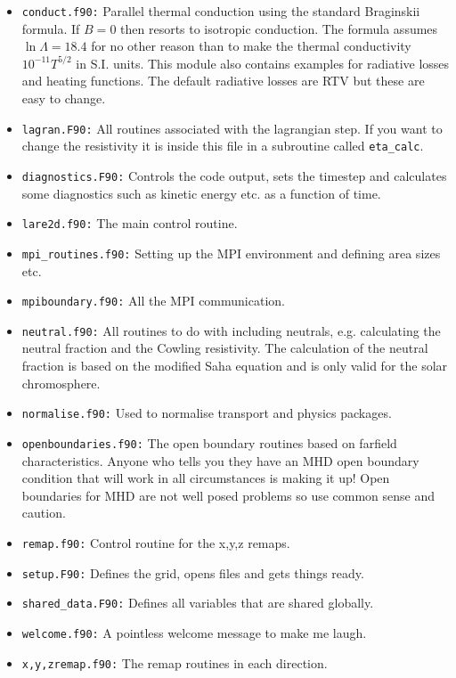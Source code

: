\documentclass[11pt]{article}
\begin{document}
\begin{itemize}
  \item{\texttt{conduct.f90:}} Parallel thermal conduction using the standard Braginskii formula. If $B=0$ then 
  resorts to isotropic conduction. The formula assumes $\ln\Lambda=18.4$ for no other reason than to make the 
  thermal conductivity $10^{-11}T^{5/2}$ in S.I. units. This module also contains examples for radiative losses 
  and heating functions. The default radiative losses are RTV but these are easy to change.
  \item{\texttt{lagran.F90:}} All routines associated with the lagrangian step. If you want to change the 
  resistivity it is inside this file in a subroutine called \texttt{eta\_calc}.
  \item{\texttt{diagnostics.F90:}} Controls the code output, sets the timestep and calculates some diagnostics such as 
  kinetic energy etc. as a function of time.
  \item{\texttt{lare2d.f90:}} The main control routine.
  \item{\texttt{mpi\_routines.f90:}} Setting up the MPI environment and defining area sizes etc.
  \item{\texttt{mpiboundary.f90:}} All the MPI communication.
  \item{\texttt{neutral.f90:}} All routines to do with including neutrals, e.g. calculating the neutral fraction and 
  the Cowling resistivity. The calculation of the neutral fraction is based on the modified Saha equation and is only 
  valid for the solar chromosphere.
  \item{\texttt{normalise.f90:}} Used to normalise transport and physics packages.
  \item{\texttt{openboundaries.f90:}} The open boundary routines based on farfield characteristics. Anyone who tells 
  you they have an MHD open boundary condition that will work in all circumstances is making it up! Open boundaries 
  for MHD are not well posed problems so use common sense and caution.
  \item{\texttt{remap.f90:}} Control routine for the x,y,z remaps.
  \item{\texttt{setup.F90:}} Defines the grid, opens files and gets things ready.
  \item{\texttt{shared\_data.F90:}} Defines all variables that are shared globally.
  \item{\texttt{welcome.f90:}} A pointless welcome message to make me laugh.
  \item{\texttt{x,y,zremap.f90:}} The remap routines in each direction.
\end{itemize}
\end{document}

